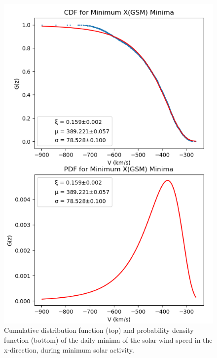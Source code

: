 \documentclass[12pt]{article}
\begin{document}
\begin{figure}[t!]
\begin{minipage}{0.48\textwidth}
                \includegraphics[width=\textwidth]{fig_method/SWEminXmin.png}
                \caption{Cumulative distribution function (top) and probability density function (bottom) of the daily minima of the solar wind speed in the x-direction, during minimum solar activity.}
                \label{fig:SWEminXmin}
            \end{minipage}
        \end{figure}
\end{document}

